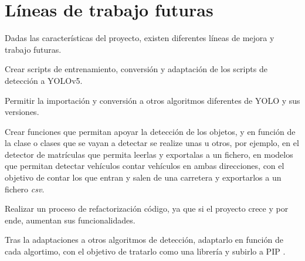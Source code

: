 \section{Líneas de trabajo futuras}
Dadas las características del proyecto, existen diferentes líneas de mejora y trabajo futuras.

\begin{list}{\textbullet}{ %
    \addtolength{\itemsep}{-2mm} %
    \setlength{\itemindent}{2mm}}
    \item Crear scripts de entrenamiento, conversión y adaptación de los scripts de detección a YOLOv5.
    \item Permitir la importación y conversión a otros algoritmos diferentes de YOLO y sus versiones.
    \item Crear funciones que permitan apoyar la detección de los objetos, y en función de la clase o clases que se vayan a detectar se realize unas u otros, por ejemplo, en el detector de matrículas que permita leerlas y exportalas a un fichero, en modelos que permitan detectar vehículos contar vehículos en ambas direcciones, con el objetivo de contar los que entran y salen de una carretera y exportarlos a un fichero \textit{csv}.
    \item Realizar un proceso de refactorización código, ya que si el proyecto crece y por ende, aumentan sus funcionalidades.
    \item Tras la adaptaciones a otros algoritmos de detección, adaptarlo en función de cada algortimo, con el objetivo de tratarlo como una librería y subirlo a PIP \cite{pip}.
\end{list}